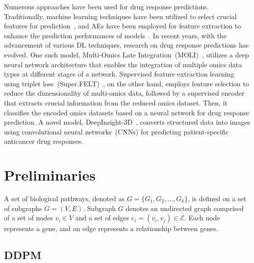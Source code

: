 \documentclass[runningheads]{llncs}
\begin{document}
Numerous approaches have been used for drug response predictions. Traditionally, machine learning techniques have been utilized to select crucial features for prediction~\cite{8, 11, 13, 18}, and AEs have been employed for feature extraction to enhance the prediction performances of models~\cite{36}. In recent years, with the advancement of various DL techniques, research on drug response predictions has evolved. One such model, Multi-Omics Late Integration~(MOLI)~\cite{29}, utilizes a deep neural network architecture that enables the integration of multiple omics data types at different stages of a network. Supervised feature extraction learning using triplet loss~(Super.FELT)~\cite{25}, on the other hand, employs feature selection to reduce the dimensionality of multi-omics data, followed by a supervised encoder that extracts crucial information from the reduced omics dataset. Then, it classifies the encoded omics datasets based on a neural network for drug response prediction. A novel model, DeepInsight-3D~\cite{30}, converts structured data into images using convolutional neural networks~(CNNs) for predicting patient-specific anticancer drug responses.


\section{Preliminaries}

A set of biological pathways, denoted as $G = \{G_1, G_2, \ldots,
G_k\}$, is defined on a set of subgraphs $G=(V, E)$. Subgraph $G$ denotes
an undirected graph comprised of a set of nodes $v_i \in V$ and a set
of edges $e_i = (v_i, v_j) \in \mathcal{E}$. Each node represents a gene, and an edge represents a relationship between genes.

\subsection{DDPM}
\end{document}
